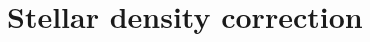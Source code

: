 \documentclass[twocolumn]{aastex631}
\begin{document}
{\vspace{5mm}







\appendix








\section{Stellar density correction}
\label{sec: stellar}

}
\end{document}
